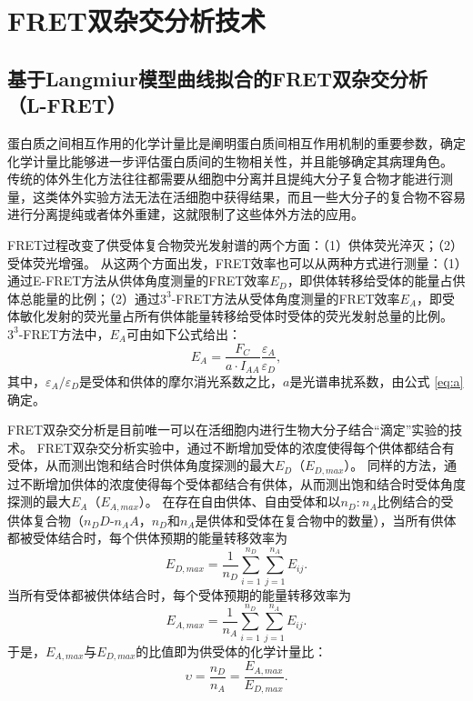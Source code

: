 \section{FRET双杂交分析技术}

\subsection{基于Langmiur模型曲线拟合的FRET双杂交分析（L-FRET）}
蛋白质之间相互作用的化学计量比是阐明蛋白质间相互作用机制的重要参数，确定化学计量比能够进一步评估蛋白质间的生物相关性，并且能够确定其病理角色。
传统的体外生化方法往往都需要从细胞中分离并且提纯大分子复合物才能进行测量，这类体外实验方法无法在活细胞中获得结果，而且一些大分子的复合物不容易进行分离提纯或者体外重建，这就限制了这些体外方法的应用。

FRET过程改变了供受体复合物荧光发射谱的两个方面：（1）供体荧光淬灭；（2）受体荧光增强。
从这两个方面出发，FRET效率也可以从两种方式进行测量：（1）通过E-FRET方法从供体角度测量的FRET效率$E_D$，即供体转移给受体的能量占供体总能量的比例；（2）通过$3^3$-FRET方法从受体角度测量的FRET效率$E_A$，即受体敏化发射的荧光量占所有供体能量转移给受体时受体的荧光发射总量的比例。
$3^3$-FRET方法中，$E_A$可由如下公式给出：
\begin{equation}
    E_A = \frac{F_C}{a \cdot I_{AA}} \frac{\varepsilon_A}{\varepsilon_D},
    \label{eq:ea}
\end{equation}
其中，$\varepsilon_A / \varepsilon_D$是受体和供体的摩尔消光系数之比，$a$是光谱串扰系数，由公式 \ref{eq:a} 确定。

FRET双杂交分析是目前唯一可以在活细胞内进行生物大分子结合“滴定”实验的技术。
FRET双杂交分析实验中，通过不断增加受体的浓度使得每个供体都结合有受体，从而测出饱和结合时供体角度探测的最大$E_D$（$E_{D,max}$）。
同样的方法，通过不断增加供体的浓度使得每个受体都结合有供体，从而测出饱和结合时受体角度探测的最大$E_A$（$E_{A,max}$）。
在存在自由供体、自由受体和以$n_D:n_A$比例结合的受供体复合物（$n_DD$-$n_AA$，$n_D$和$n_A$是供体和受体在复合物中的数量），当所有供体都被受体结合时，每个供体预期的能量转移效率为
\begin{equation}
    E_{D,max}=\frac{1}{n_D} \sum_{i=1}^{n_D} \sum_{j=1}^{n_A} E_{ij}.
\end{equation}
当所有受体都被供体结合时，每个受体预期的能量转移效率为
\begin{equation}
    E_{A,max}=\frac{1}{n_A} \sum_{i=1}^{n_D} \sum_{j=1}^{n_A} E_{ij}.
\end{equation}
于是，$E_{A,max}$与$E_{D,max}$的比值即为供受体的化学计量比：
\begin{equation}
    \upsilon = \frac{n_D}{n_A} = \frac{E_{A,max}}{E_{D,max}}. \label{eq:stoic}
\end{equation}


